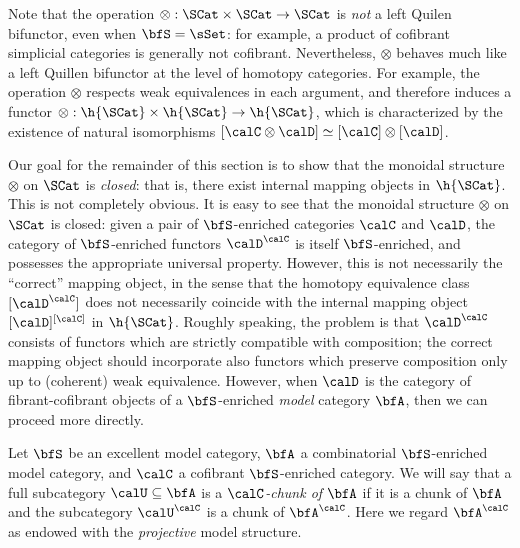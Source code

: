 Note that the operation $\otimes: \SCat \times \SCat \rightarrow \SCat$ is {\em not}
a left Quilen bifunctor, even when $\bfS = \sSet$: for example, a product of cofibrant
simplicial categories is generally not cofibrant. Nevertheless, $\otimes$ behaves
much like a left Quillen bifunctor at the level of homotopy categories. 
For example, the operation $\otimes$ respects weak equivalences in each argument, and therefore
induces a functor $\otimes: \h{ \SCat} \times \h{\SCat} \rightarrow \h{\SCat}$, which is
characterized by the existence of natural isomorphisms
$[ \calC \otimes \calD] \simeq [\calC] \otimes [\calD]$.

Our goal for the remainder of this section is to show that the monoidal structure
$\otimes$ on $\SCat$ is {\em closed}: that is, there exist internal mapping objects in
$\h{\SCat}$. This is not completely obvious. It is easy to see that the monoidal structure
$\otimes$ on $\SCat$ is closed: given a pair of $\bfS$-enriched categories $\calC$ and
$\calD$, the category of $\bfS$-enriched functors $\calD^{\calC}$ is itself $\bfS$-enriched,
and possesses the appropriate universal property. However, this is not necessarily
the ``correct'' mapping object, in the sense that the homotopy equivalence class
$[ \calD^{\calC} ]$ does not necessarily coincide with the internal mapping object
$[\calD]^{[ \calC] }$ in $\h{\SCat}$. Roughly speaking, the problem is that
$\calD^{\calC}$ consists of functors which are strictly compatible with composition; 
the correct mapping object should incorporate also functors which preserve composition only
up to (coherent) weak equivalence. However, when $\calD$ is the category of fibrant-cofibrant
objects of a $\bfS$-enriched {\em model} category $\bfA$, then we can proceed more directly.

\begin{definition}\label{cattusi}
Let $\bfS$ be an excellent model category, $\bfA$ a combinatorial $\bfS$-enriched model category,
and $\calC$ a cofibrant $\bfS$-enriched category. We will say that a full subcategory
$\calU \subseteq \bfA$ is a {\it $\calC$-chunk of $\bfA$} if it is a chunk of
$\bfA$ and the subcategory $\calU^{\calC}$ is a chunk of $\bfA^{\calC}$. 
Here we regard $\bfA^{\calC}$ as endowed with the {\em projective}
model structure.
\end{definition}


